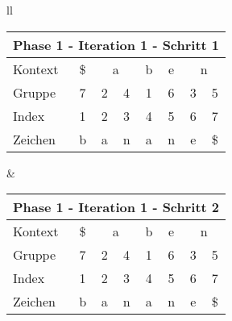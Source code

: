 \begin{table}[H]

\centering
\begin{adjustbox}{max width=\textwidth}
\begin{tabular}{ll}

\begin{tabular}{lccccccc}
\multicolumn{8}{l}{Phase 1 - Iteration 1 - Schritt 1}                                                                                                                                         \\ \hline
\multicolumn{1}{l|}{Kontext} & \multicolumn{1}{c|}{\$} & \multicolumn{2}{c|}{a}     & \multicolumn{1}{c|}{b} & \multicolumn{1}{c|}{e} & \multicolumn{2}{c}{\cellcolor[HTML]{\green}n}        \\
\multicolumn{1}{l|}{Gruppe}  & \multicolumn{1}{c|}{7}  & 2 & \multicolumn{1}{c|}{4} & \multicolumn{1}{c|}{1} & \multicolumn{1}{c|}{6} & \cellcolor[HTML]{\green}3 & \cellcolor[HTML]{\green}5 \\ \hline
\multicolumn{1}{l|}{Index}   & 1                       & 2 & 3                      & 4                      & 5                      & 6                         & 7                         \\
\multicolumn{1}{l|}{Zeichen} & b                       & a & n                      & a                      & n                      & e                         & \$                       
\end{tabular}

&

\begin{tabular}{lccccccc}
\multicolumn{8}{l}{Phase 1 - Iteration 1 - Schritt 2}                                                                                                                                               \\ \hline
\multicolumn{1}{l|}{Kontext} & \multicolumn{1}{c|}{\$} & \multicolumn{2}{c|}{a}        & \multicolumn{1}{c|}{b} & \multicolumn{1}{c|}{e}    & \multicolumn{2}{c}{\cellcolor[HTML]{\green}n}         \\
\multicolumn{1}{l|}{Gruppe}  & \multicolumn{1}{c|}{7}  & 2 & \multicolumn{1}{c|}{4}    & \multicolumn{1}{c|}{1} & \multicolumn{1}{c|}{6}    & \cellcolor[HTML]{\green}3 & \cellcolor[HTML]{\green}5 \\ \hline
\multicolumn{1}{l|}{Index}   & 1                       & 2 & \cellcolor[HTML]{\green}3 & 4                      & \cellcolor[HTML]{\green}5 & 6                         & 7                         \\
\multicolumn{1}{l|}{Zeichen} & b                       & a & \cellcolor[HTML]{\green}n & a                      & \cellcolor[HTML]{\green}n & e                         & \$                       
\end{tabular}


\end{tabular}
\end{adjustbox}
\end{table}
